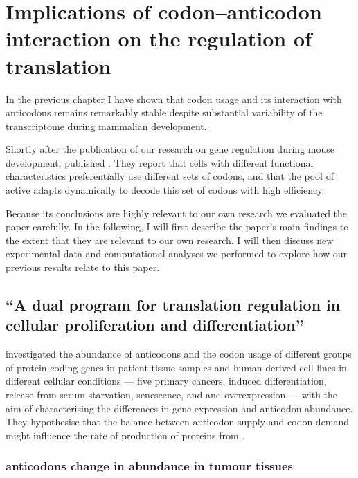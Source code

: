 \chapter{Implications of codon–anticodon interaction on the regulation of
translation}
\label{sec:codons}

In the previous chapter I have shown that codon usage and its interaction with
\trna anticodons remains remarkably stable despite substantial variability of
the transcriptome during mammalian development.

Shortly after the publication of our research on \trna gene regulation during
mouse development, \citet{Gingold:2014} published . They
report that cells with different functional characteristics preferentially use
different sets of codons, and that the pool of active \trna[s] adapts
dynamically to decode this set of codons with high efficiency.

Because its conclusions are highly relevant to our own research we evaluated the
paper carefully. In the following, I will first describe the paper’s main
findings to the extent that they are relevant to our own research. I will then
discuss new experimental data and computational analyses we performed to explore
how our previous results relate to this paper.

\section{“A dual program for translation regulation in cellular proliferation
and differentiation”}

\citet{Gingold:2014} investigated the abundance of \trna anticodons and the
codon usage of different groups of protein-coding genes in patient tissue
samples and human-derived cell lines in different cellular conditions --- five
primary cancers, induced differentiation, release from serum starvation,
senescence, and  and  overexpression --- with the
aim of characterising the differences in \trna gene expression and \trna
anticodon abundance. They hypothesise that the balance between \trna anticodon
supply and codon demand might influence the rate of production of proteins from
\mrna \citep{Gingold:2011}.

\subsection{ anticodons change in abundance in tumour tissues}

